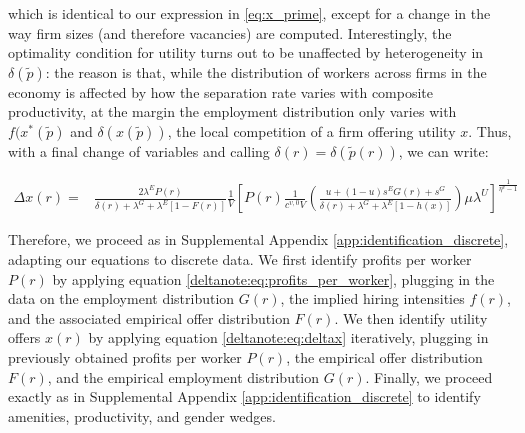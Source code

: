 %
which is identical to our expression in \eqref{eq:x_prime}, except for a change in the way firm sizes (and therefore vacancies) are computed. Interestingly, the optimality condition for utility turns out to be unaffected by heterogeneity in $\delta(\tilde{p})$: the reason is that, while the distribution of workers across firms in the economy is affected by how the separation rate varies with composite productivity, at the margin the employment distribution only varies with $f(x^{*}(\tilde{p})$ and $\delta(x(\tilde{p}))$, the local competition of a firm offering utility $x$.
%
Thus, with a final change of variables and calling $\delta(r) = \delta(\tilde{p}(r))$, we can write:
%
\begin{small}
    \begin{align}
        \Delta x(r) = &  \frac{2 \lambda^{E} P(r)}{ \delta(r) + \lambda^{G} + \lambda^{E} \left[ 1 - F(r) \right] }
        \frac{1}{V} \left[ P(r) \frac{1}{c^{v,0} V} \left( \frac{ u + (1 - u) s^{E} G(r) + s^{G} }{\delta(r) + \lambda^{G} + \lambda^{E} \left[1 - h(x) \right] } \right)  \mu \lambda^{U}\right]^{\frac{1}{\eta^{v} - 1}} \label{deltanote:eq:deltax}
    \end{align}
\end{small}
%
\newline\noindent
%
Therefore, we proceed as in Supplemental Appendix \ref{app:identification_discrete}, adapting our equations to discrete data. We first identify profits per worker $P(r)$ by applying equation \ref{deltanote:eq:profits_per_worker}, plugging in the data on the employment distribution $G(r)$, the implied hiring intensities $f(r)$, and the associated empirical offer distribution $F(r)$. We then identify utility offers $x(r)$ by applying equation \eqref{deltanote:eq:deltax} iteratively, plugging in previously obtained profits per worker $P(r)$, the empirical offer distribution $F(r)$, and the empirical employment distribution $G(r)$. Finally, we proceed exactly as in Supplemental Appendix \ref{app:identification_discrete} to identify amenities, productivity, and gender wedges.
